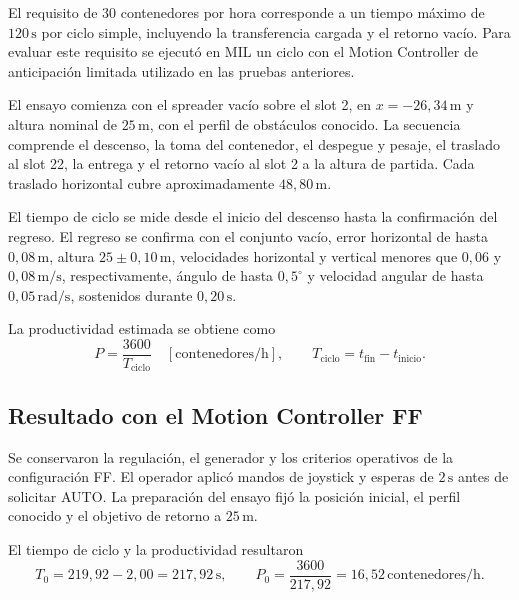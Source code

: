 \documentclass[a4paper,10pt,onecolumn,journal]{ieeeconf}
\numberwithin{equation}{section}
\newcommand{\un}[1]{\,\mathrm{#1}}
\begin{document}
El requisito de 30 contenedores por hora corresponde a un tiempo máximo de $120\un{s}$ por ciclo simple, incluyendo la transferencia cargada
y el retorno vacío. Para evaluar este requisito se ejecutó en MIL un ciclo con el Motion Controller de anticipación limitada utilizado en las pruebas anteriores.

El ensayo comienza con el spreader vacío sobre el slot 2, en
$x=-26{,}34\un{m}$ y altura nominal de $25\un{m}$, con el perfil de obstáculos conocido. La secuencia comprende el descenso, la toma del contenedor, el despegue y pesaje, el traslado al slot 22, la entrega y el retorno vacío al slot 2 a la altura de partida.
Cada traslado horizontal cubre aproximadamente $48{,}80\un{m}$.

El tiempo de ciclo se mide desde el inicio del descenso hasta la confirmación del regreso. El regreso se confirma con el conjunto vacío, error horizontal de hasta $0{,}08\un{m}$, altura $25\pm0{,}10\un{m}$, velocidades horizontal y vertical menores que $0{,}06$ y $0{,}08\un{m/s}$, respectivamente, ángulo de hasta
$0{,}5^\circ$ y velocidad angular de hasta $0{,}05\un{rad/s}$,
sostenidos durante $0{,}20\un{s}$.

La productividad estimada se obtiene como
\begin{equation}
P=\frac{3600}{T_{\mathrm{ciclo}}}\quad[\mathrm{contenedores/h}],
\qquad T_{\mathrm{ciclo}}=t_{\mathrm{fin}}-t_{\mathrm{inicio}}.
\end{equation}

\subsection{Resultado con el Motion Controller FF}

Se conservaron la regulación, el generador y los criterios operativos de la configuración FF. El operador aplicó mandos de joystick y esperas de $2\un{s}$ antes de solicitar AUTO.
La preparación del ensayo fijó la posición inicial, el perfil conocido y el objetivo de retorno a $25\un{m}$.

El tiempo de ciclo y la productividad resultaron
\begin{equation}
T_0=219{,}92-2{,}00=217{,}92\un{s},\qquad
P_0=\frac{3600}{217{,}92}=16{,}52\un{contenedores/h}.
\end{equation}
\end{document}
